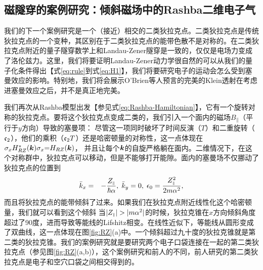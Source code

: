 \subsection{磁隧穿的案例研究：倾斜磁场中的Rashba二维电子气}\label{sec:inplanezeeman}

我们的下一个案例研究是一个（接近）相交的二类狄拉克点\cite{soluyanov_type-ii_2015,muechler_tilted_2016}。二类狄拉克点是传统狄拉克点的一个变种，其区别在于二类狄拉克点的能带色散不是对称的。在二类狄拉克点附近的量子隧穿数学上和Landau-Zener隧穿是一致的，仅仅是电场力变成了洛伦兹力\cite{AALG,obrien_magnetic_2016,kane_blount}。这里，我们将要证明Landau-Zener动力学很自然的可以从我们的量子化条件得出【式\ref{eq:rule}到式\ref{eq:H1}】，我们将要研究电子的运动会怎么受到塞曼效应的影响。特别地，我们将会展示O'Brien等人预言的\cite{obrien_magnetic_2016}完美的Klein透射在考虑进塞曼效应之后，并不是真正地完美。

我们再次从Rashba模型出发【参见式\ref{eq:Rashba-Hamiltonian}】，它有一个旋转对称的狄拉克点。要将这个狄拉克点变成二类的，我们引入一个面内的磁场$B_\parallel$（平行于$y$方向）导致的塞曼项：
尽管这一项同时破坏了时间反演（$T$）和二重旋转（$\mathfrak{c}_2$），他们的乘积（$\mathfrak{c}_2 T$）还是哈密顿量的对称性，这一点体现在 $\sigma_x H^*_{RZ}(\boldsymbol{k})\sigma_x{=}H_{RZ}(\boldsymbol{k})$， 并且让每个$\boldsymbol{k}$的自旋严格躺在面内。二维情况下，在这个对称群中，狄拉克点可以移动，但是不能够打开能隙。面内的塞曼场不仅挪动了狄拉克点的位置到
\begin{eqnarray}
\bar{k}_x & = & -\frac{Z_{\scriptscriptstyle{\parallel}}}{\hbar\alpha},\;\bar{k}_y=0,\;\epsilon_{0}=\frac{Z_{\scriptscriptstyle{\parallel}}^{2}}{2m\alpha^2},\label{whereisdiracpoint}
\end{eqnarray}
而且将狄拉克点的能带倾斜了过来。如果我们在狄拉克点附近线性化这个哈密顿量，我们就可以看到这个倾斜
当$|\zpar|>|m\alpha^2|$的时候，狄拉克锥在$x$方向倾斜角度超过了90度，进而导致等能线的Lifshitz相变。在线性近似下，等能线从圆形变成了双曲线，这一点体现在图\ref{fig:RZ}(a)中。一个倾斜超过九十度的狄拉克锥就是第二类的狄拉克锥。我们的案例研究就是要研究两个电子口袋连接在一起的第二类狄拉克点（参见图\ref{fig:RZ}(a,b)），这个案例研究和前人的不同\cite{obrien_magnetic_2016,AALG}，前人研究的第二类狄拉克点是电子和空穴口袋之间相交得到的。

